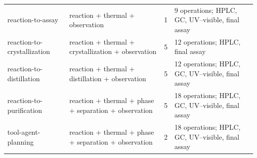 \documentclass[10pt,twocolumn]{article}
\begin{document}
\begin{@twocolumnfalse}
\begin{tabularx}{\textwidth}{@{}L{0.22\textwidth}L{0.32\textwidth}rY@{}}
reaction-to-assay & reaction + thermal + observation & 1 & 9 operations; HPLC, GC, UV--visible, final assay \\
reaction-to-crystallization & reaction + thermal + crystallization + observation & 5 & 12 operations; HPLC, final assay \\
reaction-to-distillation & reaction + thermal + distillation + observation & 5 & 12 operations; HPLC, GC, UV--visible, final assay \\
reaction-to-purification & reaction + thermal + phase + separation + observation & 5 & 18 operations; HPLC, GC, UV--visible, final assay \\
tool-agent-planning & reaction + thermal + phase + separation + observation & 2 & 18 operations; HPLC, GC, UV--visible, final assay \\
\bottomrule
\end{tabularx}
\par\medskip

\end{@twocolumnfalse}
\end{document}
